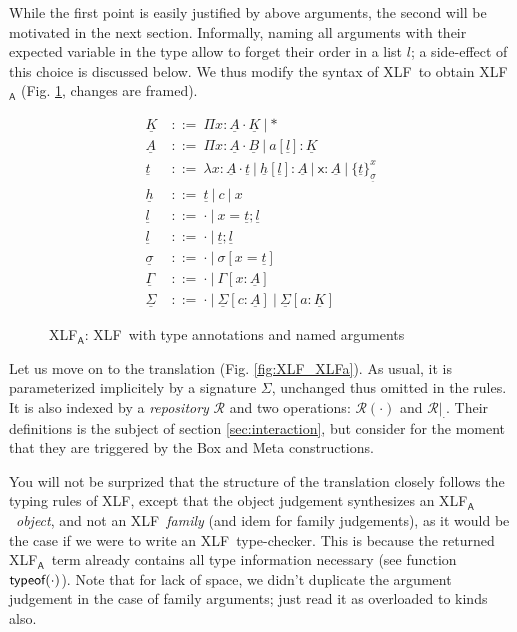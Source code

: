 \documentclass[preprint]{sigplanconf}
\newcommand\memph[1]{\boxed{#1}}
\newcommand\anonarg{\cdot}
\newcommand\gor{\ |\ }
\newcommand\gequal{\ ::=\ }
\newcommand\meta[1]{\textsf{#1}}
\newcommand\typ[2]{{#1}:{#2}}
\newcommand\mv{x}
\newcommand\mmeta{\meta x}
\newcommand\mco{c}
\newcommand\mcf{a}
\newcommand\repo[1]{\mathcal{#1}}
\newcommand\mr{\repo R}
\newcommand\postbinder{\cdot}
\newcommand\prd[2]{\Pi{#1}:{#2}\postbinder}
\newcommand\tlam[2]{\lambda{#1}:{#2}\postbinder}
\newcommand\lam{\tlam}
\newcommand\obox[3]{\{{#1}\}^{#2}_{#3}}
\newcommand\srt[1]{\mathsf{#1}}
\newcommand\type{\srt *}
\newcommand\laapp[3]{{#1}[{#2}]:{#3}}
\newcommand\lnil{\cdot}
\newcommand\lcons[2]{{#1};{#2}}
\newcommand\lncons[3]{{#1}={#2};{#3}}
\newcommand\enil\cdot
\newcommand\eent[1]{[{#1}]}
\newcommand\econs[2]{{#1}\eent{#2}}
\newcommand\ebinddecl[3]{\econs{#1}{{#2}:{#3}}}
\newcommand\snil\enil
\newcommand\sent[2]{[{#1}={#2}]}
\newcommand\scons[3]{{#1}\sent{#2}{#3}}
\newcommand\slook[2]{{#1}({#2})}
\newcommand\lang[1]{\textsf{#1}}
\newcommand\XLF{\lang{XLF}}
\newcommand\XLFa{\lang{XLF$_\lang A$}}
\newcommand\XLFamod[1]{\underline{#1}}
\def\inXLFa{\def\thelangmod{\XLFamod}}
\newcommand\mk{\thelangmod{K}}
\newcommand\mf{\thelangmod{A}}
\newcommand\mmf{\thelangmod{B}}
\newcommand\mo{\thelangmod{t}}
\newcommand\mh{\thelangmod{h}}
\newcommand\ma{\thelangmod{l}}
\newcommand\ms{\thelangmod{\sigma}}
\newcommand\me{\thelangmod{\Gamma}}
\newcommand\msi{\thelangmod{\Sigma}}
\newcommand\function[2]{\ensuremath\textsf{#1}(#2)}
\newcommand\typeof[1]{\function{typeof}{#1}}
\newcommand\rgo[2]{{#1}|_{#2}}
\newcommand\rlook\slook
\begin{document}
While the first point is easily justified by above arguments, the
second will be motivated in the next section. Informally, naming all
arguments with their expected variable in the type allow to forget
their order in a list $l$; a side-effect of this choice is discussed
below. We thus modify the syntax of \XLF\ to obtain \XLFa
(Fig. \ref{fig:XLFa}, changes are framed).

\begin{figure}
  \inXLFa
  \begin{align*}
    \mk &\gequal { \prd\mv\mf\mk
      \gor \type } \\
    \mf &\gequal { \prd\mv\mf\mmf
      \gor \memph{\laapp\mcf\ma\mk} } \\
    \mo &\gequal { \lam\mv\mf\mo
      \gor \memph{\laapp\mh\ma\mf}
      \gor \memph{\typ\mmeta\mf}
      \gor \obox\mo\mv\ms } \\
    \mh &\gequal { \mo
      \gor \mco
      \gor \mv } \\
    \ma &\gequal {\lnil
      \gor \memph{\lncons \mv\mo\ma}} \\
    \ma &\gequal { \lnil
      \gor \lcons\mo\ma } \\
    \ms &\gequal { \snil
      \gor \scons \sigma\mv\mo } \\[0.5em]
    \me &\gequal { \enil
      \gor \ebinddecl \Gamma\mv\mf } \\
    \msi &\gequal { \enil
      \gor \ebinddecl\msi\mco\mf
      \gor \ebinddecl\msi\mcf\mk }
  \end{align*}
  \caption{\XLFa: \XLF\ with type annotations and named arguments}
\label{fig:XLFa}
\end{figure}

Let us move on to the translation (Fig. \ref{fig:XLF_XLFa}). As usual,
it is parameterized implicitely by a signature $\Sigma$, unchanged
thus omitted in the rules. It is also indexed by a \emph{repository}
$\mr$ and two operations: $\rlook\mr\anonarg$ and
$\rgo\mr\anonarg$. Their definitions is the subject of section
\ref{sec:interaction}, but consider for the moment that they are
triggered by the \textsf{Box} and \textsf{Meta} constructions.

You will not be surprized that the structure of the translation
closely follows the typing rules of \XLF, except that the object
judgement synthesizes an \XLFa\ \emph{object}, and not an \XLF\
\emph{family} (and idem for family judgements), as it would be the
case if we were to write an \XLF\ type-checker. This is because the
returned \XLFa\ term already contains all type information necessary
(see function $\typeof\anonarg$). Note that for lack of space, we
didn't duplicate the argument judgement in the case of family
arguments; just read it as overloaded to kinds also.
\end{document}

